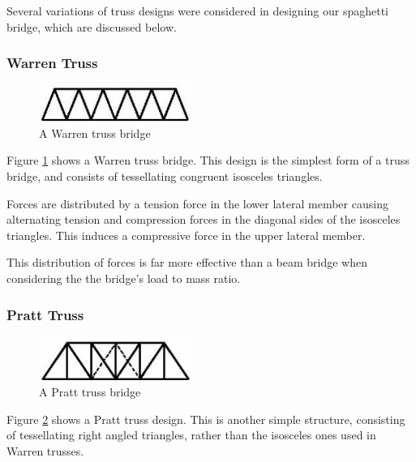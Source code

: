 \documentclass[a4paper,11pt]{article}
\begin{document}
Several variations of truss designs were considered in designing our spaghetti
bridge, which are discussed below.


\subsubsection{Warren Truss}

\begin{figure}
\begin{center}
\includegraphics[width=5cm]{figures/warren.png}
\end{center}
\caption{A Warren truss bridge}
\label{research:warren}
\end{figure}

Figure \ref{research:warren} shows a Warren truss bridge.
This design is the simplest form of a truss bridge, and consists of tessellating
congruent isosceles triangles.

Forces are distributed by a tension force in the lower lateral member causing
alternating tension and compression forces in the diagonal sides of the
isosceles triangles.
This induces a compressive force in the upper lateral member.

This distribution of forces is far more effective than a beam bridge when
considering the  the bridge's load to mass ratio.


\subsubsection{Pratt Truss}

\begin{figure}
\begin{center}
\includegraphics[width=5cm]{figures/pratt.png}
\end{center}
\caption{A Pratt truss bridge}
\label{research:pratt}
\end{figure}

Figure \ref{research:pratt} shows a Pratt truss design.
This is another simple structure, consisting of tessellating right angled
triangles, rather than the isosceles ones used in Warren trusses.
\end{document}
